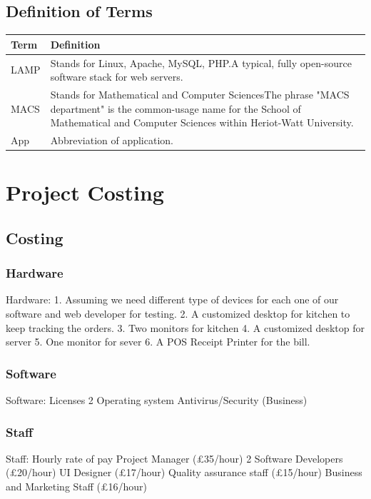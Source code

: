 \documentclass[11pt, a4paper]{report}
\begin{document}
\pagebreak

\section{Definition of Terms}
\vspace{1cm}

\begin{tabulary}{1.2\textwidth}{l L}
Term & Definition \\ \midrule

LAMP & Stands for Linux, Apache, MySQL, PHP.\newline A typical, fully open-source software stack for web servers. \\ \midrule
MACS & Stands for Mathematical and Computer Sciences\newline The phrase "MACS department" is the common-usage name for the School of Mathematical and Computer Sciences within Heriot-Watt University. \\ \midrule
App & Abbreviation of application.
\end{tabulary}

\chapter{Project Costing} 
\pagebreak 

\section{Costing} 
\subsection{Hardware} 
Hardware:
1.	Assuming we need different type of devices for each one of our software and web developer for testing.
2.	A customized desktop for kitchen to keep tracking the orders.
3.	Two monitors for kitchen
4.	A customized desktop for server
5.	One monitor for sever
6.	A POS Receipt Printer for the bill.
\subsection{Software} 
Software:
Licenses
2 Operating system
Antivirus/Security (Business)
\subsection{Staff} 
Staff:
Hourly rate of pay
Project Manager			(£35/hour)
2 Software Developers			(£20/hour)
UI Designer				(£17/hour)
Quality assurance staff		(£15/hour)
Business and Marketing Staff		(£16/hour)
\end{document}
